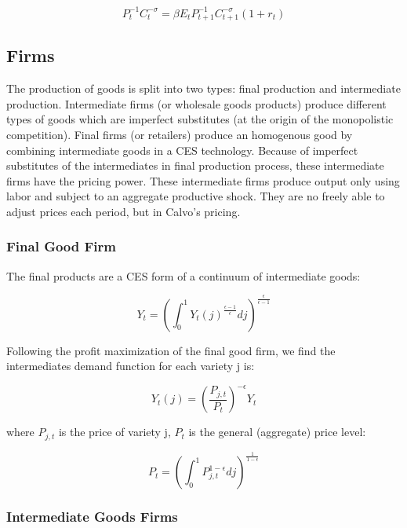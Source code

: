 \documentclass[cn,10pt,math=newtx,citestyle=gb7714-2015,bibstyle=gb7714-2015]{elegantbook}
\begin{document}
	\begin{equation}
		P_t^{-1}C_t^{-\sigma}=\beta E_tP_{t+1}^{-1}C_{t+1}^{-\sigma}(1+r_t)
	\end{equation}
	
	
	\subsection{Firms}
	
	The production of goods is split into two types: final production and intermediate production. Intermediate firms (or wholesale goods products) produce different types of goods which are imperfect substitutes (at the origin of the monopolistic competition). Final firms (or retailers) produce an homogenous good by combining intermediate goods in a CES technology. Because of imperfect substitutes of the intermediates in final production process, these intermediate firms have the pricing power. These intermediate firms produce output only using labor and subject to an aggregate productive shock. They are no freely able to adjust prices each period, but in Calvo's pricing.
	
	\subsubsection{Final Good Firm}
	
	The final products are a CES form of a continuum of intermediate goods:
	
	\begin{equation}
		Y_t=\left(\int_0^1Y_t(j)^{\frac{\epsilon-1}{\epsilon}}dj \right)^{\frac{\epsilon}{\epsilon-1}}
	\end{equation}
	
	Following the profit maximization of the final good firm, we find the intermediates demand function for each variety j is:
	
	\begin{equation}
		Y_t(j)=\left(\frac{P_{j,t}}{P_t}\right)^{-\epsilon}Y_t
	\end{equation}
	
	where $P_{j,t}$ is the price of variety j, $P_t$ is the general (aggregate) price level:
	
	\begin{equation}
		P_t=\left(\int_0^1P_{j,t}^{1-\epsilon}dj\right)^{\frac{1}{1-\epsilon}}
	\end{equation}
	
	\subsubsection{Intermediate Goods Firms}
	
\end{document}
